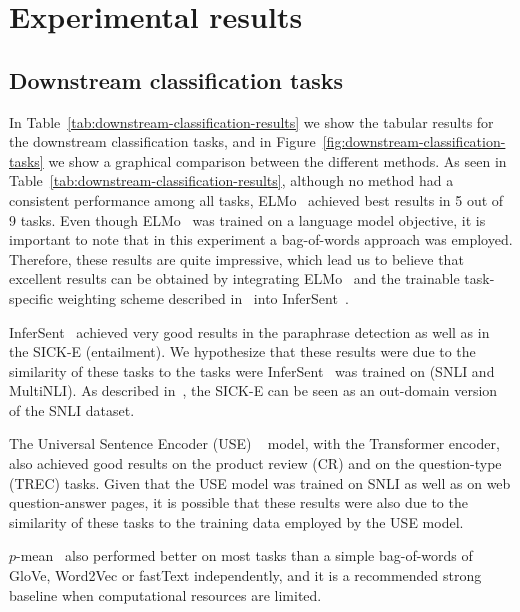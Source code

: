 \documentclass{article}
\begin{document}
\section{Experimental results}
\label{sec:experimental-results}

\subsection{Downstream classification tasks}
In Table~\ref{tab:downstream-classification-results} we show the tabular results for the downstream classification tasks, and in Figure~\ref{fig:downstream-classification-tasks} we show a graphical comparison between the different methods. As seen in Table~\ref{tab:downstream-classification-results}, although no method had a consistent performance among all tasks, ELMo~\cite{peters2018deep} achieved best results in 5 out of 9 tasks. Even though ELMo~\cite{peters2018deep} was trained on a language model objective, it is important to note that in this experiment a bag-of-words approach was employed. Therefore, these results are quite impressive, which lead us to believe that excellent results can be obtained by integrating ELMo~\cite{peters2018deep} and the trainable task-specific weighting scheme described in~\cite{peters2018deep} into InferSent~\cite{conneau2017supervised}. 

InferSent~\cite{conneau2017supervised} achieved very good results in the paraphrase detection as well as in the SICK-E (entailment). We hypothesize that these results were due to the similarity of these tasks to the tasks were InferSent~\cite{conneau2017supervised} was trained on (SNLI and MultiNLI). As described in~\cite{conneau2017supervised}, the SICK-E can be seen as an out-domain version of the SNLI dataset.

The Universal Sentence Encoder (USE) ~\cite{DBLP:journals/corr/abs-1803-11175} model, with the Transformer encoder, also achieved good results on the product review (CR) and on the question-type (TREC) tasks. Given that the USE model was trained on SNLI as well as on web question-answer pages, it is possible that these results were also due to the similarity of these tasks to the training data employed by the USE model.

$p$-mean~\cite{DBLP:journals/corr/abs-1803-01400} also performed better on most tasks than a simple bag-of-words of GloVe, Word2Vec or fastText independently, and it is a recommended strong baseline when computational resources are limited. 
\end{document}
